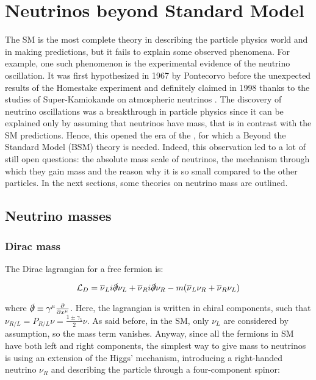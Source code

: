 \section{Neutrinos beyond Standard Model}\label{BSM}
The SM is the most complete theory in describing the particle physics world and in making predictions, but it fails to explain some observed phenomena. For example, one such phenomenon is the experimental evidence of the neutrino oscillation. It was first hypothesized in 1967 by Pontecorvo \cite{Pontecorvo-idea} before the unexpected results of the Homestake experiment \cite{Homestake} and definitely claimed in 1998 thanks to the studies of Super-Kamiokande on atmospheric neutrinos \cite{SK-oscill-confirm}. The discovery of neutrino oscillations was a breakthrough in particle physics since it can be explained only by assuming that neutrinos have mass, that is in contrast with the SM predictions. Hence, this opened the era of the , for which a Beyond the Standard Model (BSM) theory is needed. Indeed, this observation led to a lot of still open questions: the absolute mass scale of neutrinos, the mechanism through which they gain mass and the reason why it is so small compared to the other particles. In the next sections, some theories on neutrino mass are outlined. 

\subsection{Neutrino masses}
\subsubsection{Dirac mass}
The Dirac lagrangian for a free fermion is: 

\begin{equation}
    \mathcal{L}_D = \overline{\nu}_Li\slashed{\partial}\nu_L + \overline{\nu}_Ri\slashed{\partial}\nu_R - m(\overline{\nu}_L\nu_R + \overline{\nu}_R\nu_L)
\end{equation}

where $\slashed{\partial} \equiv \gamma^\mu \frac{\partial}{\partial x^\mu}$. Here, the lagrangian is written in chiral components, such that $\nu_{R/L} = P_{R/L}\nu = \frac{1\pm\gamma_5}{2}\nu$. As said before, in the SM, only $\nu_L$ are considered by assumption, so the mass term vanishes.
Anyway, since all the fermions in SM have both left and right components, the simplest way to give mass to neutrinos is using an extension of the Higgs' mechanism, introducing a right-handed neutrino $\nu_R$ and describing the particle through a four-component spinor:

